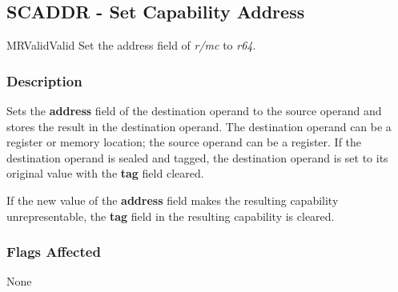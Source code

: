 \clearpage
{}
{}
\subsection*{SCADDR - Set Capability Address}

\begin{x86opcodetable}
  {MR}{Valid}{Valid}
  {Set the address field of \emph{r/mc} to \emph{r64}.}
\end{x86opcodetable}

\begin{x86opentable}
\end{x86opentable}

\subsubsection*{Description}

Sets the \textbf{address} field of the destination operand to the
source operand and stores the result in the destination operand.  The
destination operand can be a register or memory location; the source
operand can be a register.  If the destination operand is sealed and
tagged, the destination operand is set to its original value with the
\textbf{tag} field cleared.

If the new value of the \textbf{address} field makes the resulting
capability unrepresentable, the \textbf{tag} field in the resulting
capability is cleared.

\subsubsection*{Flags Affected}

None
